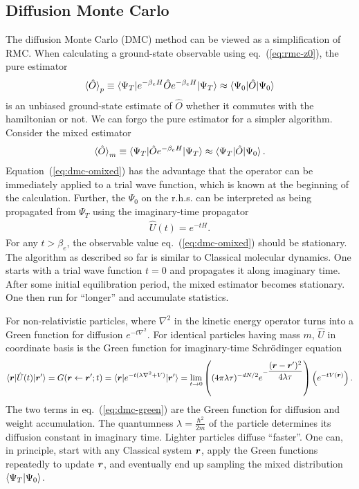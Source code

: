 \subsection{Diffusion Monte Carlo}
The diffusion Monte Carlo (DMC) method can be viewed as a simplification of RMC.
When calculating a ground-state observable using eq.~(\ref{eq:rmc-z0}), the pure estimator
\begin{align} \label{eq:dmc-opure}
\braket{\hat{O}}_p \equiv \braket{\Psi_T|e^{-\beta_e H}\hat{O}e^{-\beta_e H}|\Psi_T} \approx \braket{\Psi_0|\hat{O}|\Psi_0}
\end{align}
is an unbiased ground-state estimate of $\hat{O}$ whether it commutes with the hamiltonian or not. We can forgo the pure estimator for a simpler algorithm. Consider the mixed estimator
\begin{align} \label{eq:dmc-omixed}
\braket{\hat{O}}_m \equiv \braket{\Psi_T|\hat{O}e^{-\beta_e H}|\Psi_T}\approx\braket{\Psi_T|\hat{O}|\Psi_0}.
\end{align}
Equation~(\ref{eq:dmc-omixed}) has the advantage that the operator can be immediately applied to a trial wave function, which is known at the beginning of the calculation. Further, the $\Psi_0$ on the r.h.s. can be interpreted as being propagated from $\Psi_T$ using the imaginary-time propagator
\begin{align}
\hat{U}(t) = e^{-t H}.
\end{align}
For any $t>\beta_e$, the observable value eq.~(\ref{eq:dmc-omixed}) should be stationary. The algorithm as described so far is similar to Classical molecular dynamics. One starts with a trial wave function $t=0$ and propagates it along imaginary time. After some initial equilibration period, the mixed estimator becomes stationary. One then run for ``longer'' and accumulate statistics.

For non-relativistic particles, where $\nabla^2$ in the kinetic energy operator turns into a Green function for diffusion $e^{-t\nabla^2}$. For identical particles having mass $m$, $\hat{U}$ in coordinate basis is the Green function for imaginary-time Schr\"odinger equation
\begin{align}
\braket{\boldsymbol{r}|\hat{U}(t)|\boldsymbol{r}'} = G(\boldsymbol{r}\leftarrow\boldsymbol{r}';t) = \braket{\boldsymbol{r}|e^{-t(\lambda \nabla^2+V)}|\boldsymbol{r}'} = \lim\limits_{t\rightarrow 0}
\left(
(4\pi\lambda\tau)^{-dN/2}e^{-\dfrac{(\boldsymbol{r}-\boldsymbol{r}')^2}{4\lambda\tau}}
\right)
\left(
e^{-tV(\boldsymbol{r})}
\right). \label{eq:dmc-green}
\end{align}
The two terms in eq.~(\ref{eq:dmc-green}) are the Green function for diffusion and weight accumulation.
The quantumness $\lambda=\frac{\hbar^2}{2m}$ of the particle determines its diffusion constant in imaginary time. Lighter particles diffuse ``faster''. One can, in principle, start with any Classical system $\boldsymbol{r}$, apply the Green functions repeatedly to update $\boldsymbol{r}$, and eventually end up sampling the mixed distribution $\braket{\Psi_T|\Psi_0}$.

